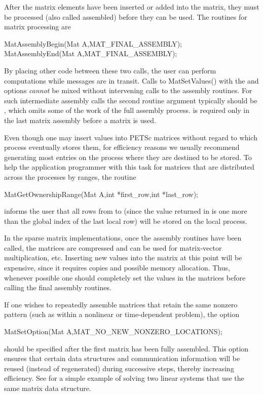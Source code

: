 After the matrix elements have been inserted or added into the matrix, 
they must be processed (also called assembled) before they can be used. The routines for matrix
processing are  
\begin{tabbing}
  MatAssemblyBegin(Mat A,MAT\_FINAL\_ASSEMBLY);\\
  MatAssemblyEnd(Mat A,MAT\_FINAL\_ASSEMBLY);
\end{tabbing}
By placing other code between these two calls, the user can perform
computations while messages are in transit.
Calls to MatSetValues() with the  and  options {\em cannot} be mixed without intervening calls to
the assembly routines.  For such intermediate assembly calls the
second routine argument  typically should be ,
 which omits some of the work of the full 
assembly process.    is
required only in the last matrix assembly before a matrix is used.

Even though one may insert values into PETSc matrices without regard
to which process eventually stores them, for efficiency
reasons we usually recommend generating most entries on the
process where they are destined to be stored.  To help the
application programmer with this task for matrices that are
distributed across the processes by ranges, the routine
\begin{tabbing}
  MatGetOwnershipRange(Mat A,int *first\_row,int *last\_row);
\end{tabbing}
informs the user that all rows from  to 
 (since the value returned in  is one more
than the global index of the last local row) will be stored on the local process.

In the sparse matrix implementations, once the assembly routines have been 
called, the matrices are compressed and can be used for matrix-vector
multiplication, etc.
Inserting new values into the matrix at this point will be expensive, 
since it requires copies and possible memory allocation. Thus, whenever 
possible one should completely set the values in the matrices before 
calling the final assembly routines. 

If one wishes to repeatedly assemble matrices that retain the same
nonzero pattern (such as within a nonlinear or time-dependent
problem), the option
\begin{tabbing}
  MatSetOption(Mat A,MAT\_NO\_NEW\_NONZERO\_LOCATIONS);
\end{tabbing}
should be specified after the first matrix has been fully assembled.
This option ensures that certain data structures and communication
information will be reused (instead of regenerated) during successive
steps, thereby increasing efficiency.  
See  for a simple example of
solving two linear systems that use the same matrix data structure.

